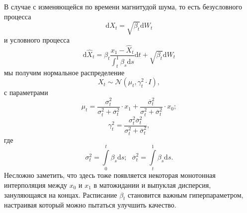 \documentclass[12pt]{article}
\theoremstyle{definition}
\begin{document}
В случае с изменяющейся по времени магнитудой шума, то есть безусловного процесса
\[
    \mathrm{d} X_t = \sqrt{\beta_t} \mathrm{d} W_t
\]
и условного процесса
\[
    \mathrm{d} \hat{X}_t = \beta_t \frac{x_1 - \hat{X}_t}{\int_{t}^{1} \beta_s \mathrm{d} s} \mathrm{d} t + \sqrt{\beta_t} \mathrm{d} W_t
\]
мы получим нормальное распределение
\[
    X_t \sim \mathcal{N}\left(\mu_t, \gamma^2_t \cdot I\right),
\]
с параметрами
\[
    \mu_t = \frac{\sigma^2_t}{\sigma^2_t + \overline{\sigma}^2_t} \cdot x_1 + \frac{\overline{\sigma}^2_t}{\sigma^2_t + \overline{\sigma}^2_t} \cdot x_0;
\]
\[
    \gamma^2_t = \frac{\sigma^2_t \overline{\sigma}^2_t}{\sigma^2_t + \overline{\sigma}^2_t},
\]
где
\[
    \sigma^2_t = \int\limits_{0}^{t} \beta_s \mathrm{d} s; \:\:\: \overline{\sigma}^2_t = \int\limits_{t}^{1} \beta_s \mathrm{d} s.
\]
Несложно заметить, что здесь тоже появляется некоторая монотонная интерполяция между $x_0$ и $x_1$ в матожидании и выпуклая дисперсия, зануляющаяся на концах. Расписание $\beta_t$ становится важным гиперпараметром, настраивая который можно пытаться улучшить качество.


\newpage


\end{document}
